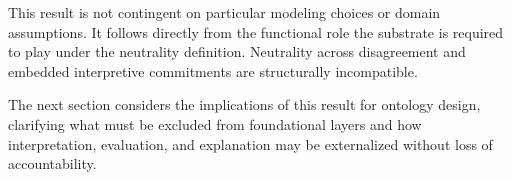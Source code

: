 This result is not contingent on particular modeling choices
or domain assumptions.
It follows directly from the functional role
the substrate is required to play under the neutrality definition.
Neutrality across disagreement and embedded interpretive commitments
are structurally incompatible.

The next section considers the implications of this result for ontology design,
clarifying what must be excluded from foundational layers
and how interpretation, evaluation, and explanation
may be externalized without loss of accountability.
